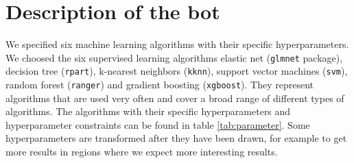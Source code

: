 \documentclass{article}
\begin{document}
\section{Description of the bot}

We specified six machine learning algorithms with their specific hyperparameters.
We choosed the six supervised learning algorithms elastic net (\texttt{glmnet} package), 
decision tree (\texttt{rpart}), k-nearest neighbors (\texttt{kknn}), 
support vector machines (\texttt{svm}), random forest (\texttt{ranger}) 
and gradient boosting (\texttt{xgboost}). They represent algorithms that are used very 
often and cover a broad range of different types of algorithms. 
The algorithms with their specific hyperparameters and hyperparameter constraints can 
be found in table \ref{tab:parameter}. Some hyperparameters are transformed after they have been drawn, 
for example to get more results in regions where we expect more interesting results. 
\end{document}
